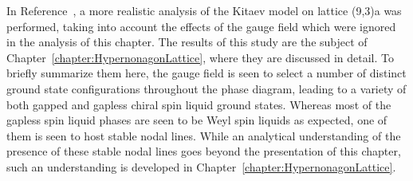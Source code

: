 In Reference~\cite{MischenkoPRB2019}, a more realistic analysis of the Kitaev model on lattice (9,3)a was performed, taking into account the effects of the gauge field which were ignored in the analysis of this chapter.
The results of this study are the subject of Chapter~\ref{chapter:HypernonagonLattice}, where they are discussed in detail.
To briefly summarize them here, the gauge field is seen to select a number of distinct ground state configurations throughout the phase diagram, leading to a variety of both gapped and gapless chiral spin liquid ground states.
Whereas most of the gapless spin liquid phases are seen to be Weyl spin liquids as expected, one of them is seen to host stable nodal lines.
While an analytical understanding of the presence of these stable nodal lines goes beyond the presentation of this chapter, such an understanding is developed in Chapter~\ref{chapter:HypernonagonLattice}.